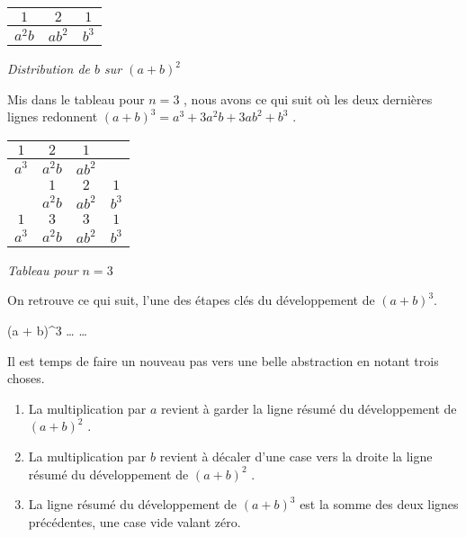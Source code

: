 \medskip
\begin{center}
\begin{tabular}{*{3}{|c}|}
	\hline
		$1$      &  $2$      &  $1$
	\\ \hline
		$a^2 b$  &  $a b^2$  &  $b^3$
	\\ \hline
\end{tabular}

\smallskip
\itshape\small
Distribution de $b$ sur $(a + b)^2$
\end{center}


\medskip

Mis dans le tableau pour $n = 3$ , nous avons ce qui suit où les deux dernières lignes redonnent $(a + b)^3 = a^3 + 3 a^2 b + 3 a b^2 + b^3$ .


\medskip
\begin{center}
\begin{tabular}{*{4}{|c}|}
	\hline
		$1$    &  $2$      &  $1$      &
	\\ \hline
		$a^3$  &  $a^2 b$  &  $a b^2$  &
	\\ \hline\hline
		       &  $1$      &  $2$      &  $1$
	\\ \hline
		       &  $a^2 b$  &  $a b^2$  &  $b^3$
	\\ \hline\hline\hline\hline
		$1$    &  $3$      &  $3$      &  $1$
	\\ \hline
		$a^3$  &  $a^2 b$  &  $a b^2$  &  $b^3$
	\\ \hline
\end{tabular}

\smallskip
\itshape\small
Tableau pour $n = 3$
\end{center}


\medskip

On retrouve ce qui suit, l'une des étapes clés du développement de $(a + b)^3$.


\medskip

\begin{stepcalc}[style = sar]
	(a + b)^3
		\explnext{}
	\dots
		\explnext{}
		\explnext[\hideit+]{}
	\phantom{x}\kern4pt%
		\explnext{}
	\dots
\end{stepcalc}


\bigskip

Il est temps de faire un nouveau pas vers une belle abstraction en notant trois choses.

\begin{enumerate}
	\item La multiplication par $a$ revient à garder la ligne résumé du développement de $(a + b)^2$ .

	\item La multiplication par $b$ revient à décaler d'une case vers la droite la ligne résumé du développement de $(a + b)^2$ .

	\item La ligne résumé du développement de $(a + b)^3$ est la somme des deux lignes précédentes, une case vide valant zéro.
\end{enumerate}


